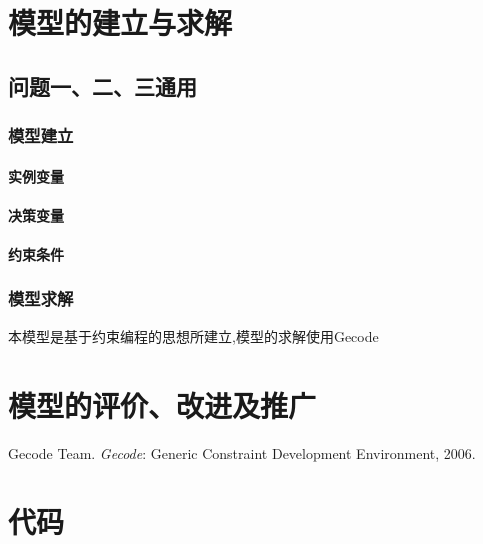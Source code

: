 \documentclass[UTF8]{ctexart}
\begin{document}
\section{模型的建立与求解}

\subsection{问题一、二、三通用}

\subsubsection{模型建立}
	\paragraph{实例变量}
	\paragraph{决策变量}
	\paragraph{约束条件}

\subsubsection{模型求解}
本模型是基于约束编程的思想所建立,模型的求解使用Gecode \cite{gecode}

\section{模型的评价、改进及推广}



\begin{thebibliography}{1}  %
 Gecode Team.  \textit{Gecode}: Generic Constraint
  Development Environment, 2006.  


\end{thebibliography}

\appendix
\section{代码}
\end{document}
